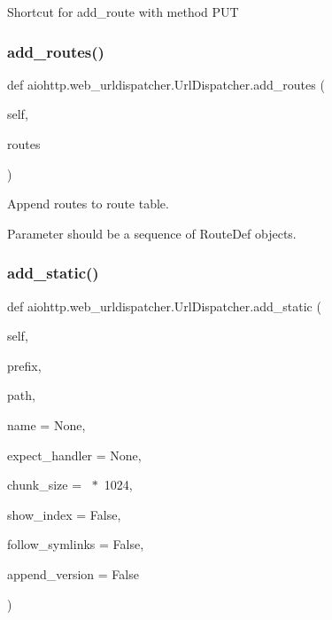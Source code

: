 \begin{DoxyVerb}Shortcut for add_route with method PUT
\end{DoxyVerb}
 \mbox{\label{classaiohttp_1_1web__urldispatcher_1_1_url_dispatcher_aa55ccedb52f2221f8a7b0b9bd1a6e33e}} 
\subsubsection{\texorpdfstring{add\+\_\+routes()}{add\_routes()}}
{\footnotesize\ttfamily def aiohttp.\+web\+\_\+urldispatcher.\+Url\+Dispatcher.\+add\+\_\+routes (\begin{DoxyParamCaption}\item[{}]{self,  }\item[{}]{routes }\end{DoxyParamCaption})}

\begin{DoxyVerb}Append routes to route table.

Parameter should be a sequence of RouteDef objects.
\end{DoxyVerb}
 \mbox{\label{classaiohttp_1_1web__urldispatcher_1_1_url_dispatcher_a51881bea91cd64ead8bd9717ba0b96ed}} 
\subsubsection{\texorpdfstring{add\+\_\+static()}{add\_static()}}
{\footnotesize\ttfamily def aiohttp.\+web\+\_\+urldispatcher.\+Url\+Dispatcher.\+add\+\_\+static (\begin{DoxyParamCaption}\item[{}]{self,  }\item[{}]{prefix,  }\item[{}]{path,  }\item[{}]{name = {\ttfamily None},  }\item[{}]{expect\+\_\+handler = {\ttfamily None},  }\item[{}]{chunk\+\_\+size = {~$\ast$~1024},  }\item[{}]{show\+\_\+index = {\ttfamily False},  }\item[{}]{follow\+\_\+symlinks = {\ttfamily False},  }\item[{}]{append\+\_\+version = {\ttfamily False} }\end{DoxyParamCaption})}

